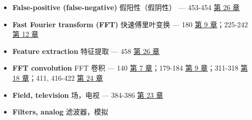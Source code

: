 \begin{itemize}
\tightlist
\item
  \textbf{False-positive (false-negative)} 假阳性（假阴性） --- 453-454
   \hyperref[ch-26]{第 26 章}
\item
  \textbf{Fast Fourier transform (FFT)} 快速傅里叶变换 --- 180
   \hyperref[ch-09]{第 9 章}；225-242 
  \hyperref[ch-12]{第 12 章}
\item
  \textbf{Feature extraction} 特征提取 --- 458 
  \hyperref[ch-26]{第 26 章}
\item
  \textbf{FFT convolution} FFT 卷积 --- 140 
  \hyperref[ch-07]{第 7 章}；179-184  \hyperref[ch-09]{第 9
  章}；311-318  \hyperref[ch-18]{第 18 章}；411, 416-422
   \hyperref[ch-24]{第 24 章}
\item
  \textbf{Field, television} 场，电视 --- 384-386 
  \hyperref[ch-23]{第 23 章}
\item
  \textbf{Filters, analog} 滤波器，模拟


\end{itemize}
